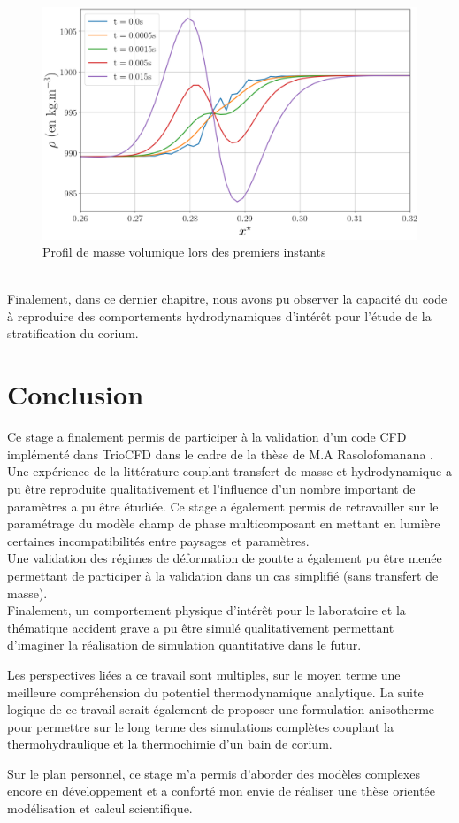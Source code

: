 \begin{minipage}{0.8\textwidth}
	\begin{figure}[H]
		\centering
		\includegraphics[width=0.8\linewidth]{figure/prof_rho_RT}
		\caption{Profil de masse volumique lors des premiers instants}
		\label{fig:profrhort}
	\end{figure}
\end{minipage} \\

Finalement, dans ce dernier chapitre, nous avons pu observer la capacité du code à reproduire des comportements hydrodynamiques d'intérêt pour l'étude de la stratification du corium. 


\chapter*{Conclusion}

Ce stage a finalement permis de participer à la validation d'un code CFD implémenté dans TrioCFD dans le cadre de la thèse de M.A Rasolofomanana \cite{rasolofomanana_modelisation_nodate}. Une expérience de la littérature couplant transfert de masse et hydrodynamique a pu être reproduite qualitativement et l'influence d'un nombre important de paramètres a pu être étudiée. Ce stage a également permis de retravailler sur le paramétrage du modèle champ de phase multicomposant en mettant en lumière certaines incompatibilités entre paysages et paramètres. \\
Une validation des régimes de déformation de goutte a également pu être menée permettant de participer à la validation dans un cas simplifié (sans transfert de masse). \\
Finalement, un comportement physique d'intérêt pour le laboratoire et la thématique accident grave a pu être simulé qualitativement permettant d'imaginer la réalisation de simulation quantitative dans le futur.

Les perspectives liées a ce travail sont multiples, sur le moyen terme une meilleure compréhension du potentiel thermodynamique analytique. La suite logique de ce travail serait également de proposer une formulation anisotherme pour permettre sur le long terme des simulations complètes couplant la thermohydraulique et la thermochimie d'un bain de corium.

Sur le plan personnel, ce stage m'a permis d'aborder des modèles complexes encore en développement et a conforté mon envie de réaliser une thèse orientée modélisation et calcul scientifique.



